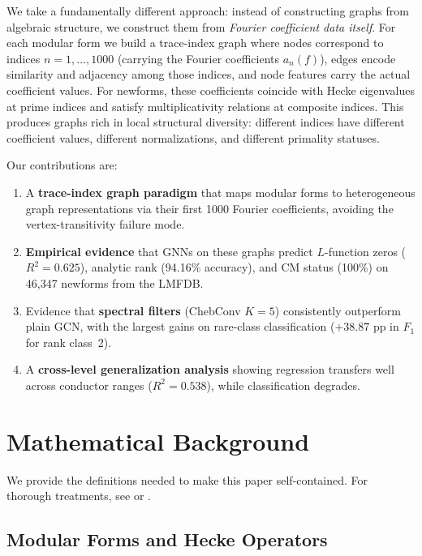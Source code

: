 \documentclass[11pt]{article}
\begin{document}
We take a fundamentally different approach: instead of constructing graphs from algebraic structure, we construct them from \emph{Fourier coefficient data itself}. For each modular form we build a trace-index graph where nodes correspond to indices $n = 1, \ldots, 1000$ (carrying the Fourier coefficients $a_n(f)$), edges encode similarity and adjacency among those indices, and node features carry the actual coefficient values. For newforms, these coefficients coincide with Hecke eigenvalues at prime indices and satisfy multiplicativity relations at composite indices. This produces graphs rich in local structural diversity: different indices have different coefficient values, different normalizations, and different primality statuses.

Our contributions are:
\begin{enumerate}
  \item A \textbf{trace-index graph paradigm} that maps modular forms to heterogeneous graph representations via their first 1000 Fourier coefficients, avoiding the vertex-transitivity failure mode.
  \item \textbf{Empirical evidence} that GNNs on these graphs predict $L$-function zeros ($R^2 = 0.625$), analytic rank (94.16\% accuracy), and CM status (100\%) on 46,347 newforms from the LMFDB.
  \item Evidence that \textbf{spectral filters} (ChebConv $K=5$) consistently outperform plain GCN, with the largest gains on rare-class classification ($+38.87$ pp in $F_1$ for rank class~2).
  \item A \textbf{cross-level generalization analysis} showing regression transfers well across conductor ranges ($R^2 = 0.538$), while classification degrades.
\end{enumerate}

\section{Mathematical Background}
\label{sec:background}

We provide the definitions needed to make this paper self-contained. For thorough treatments, see \citet{diamond2005first} or \citet{milne2020modular}.

\subsection{Modular Forms and Hecke Operators}
\end{document}
